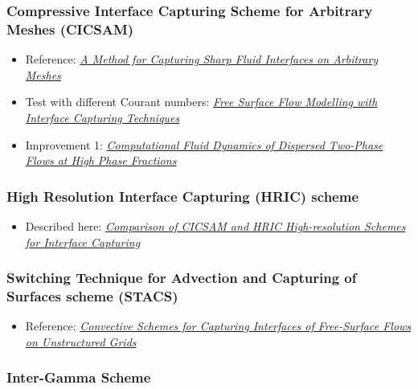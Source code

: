 \documentclass[]{report}
\begin{document}
\subsubsection{Compressive Interface Capturing Scheme for Arbitrary Meshes (CICSAM)}

\begin{itemize}
    \item Reference: \textit{\href{http://ac.els-cdn.com/S0021999199962769/1-s2.0-S0021999199962769-main.pdf?_tid=85161b57da5f4401e55c9d07495e24ea&acdnat=1336167249_a59e4f578adbacf3bff69936c48cdd57}{A Method for Capturing Sharp Fluid Interfaces on Arbitrary Meshes}}
    \item Test with different Courant numbers: \textit{\href{http://www.marin.nl/upload_mm/8/2/c/1807524470_1999999096_2007-ECCOMAS_HoekstraVazAbeilBunnik.pdf}{Free Surface Flow Modelling with Interface Capturing Techniques}}
    \item Improvement 1: \textit{\href{http://powerlab.fsb.hr/ped/kturbo/openfoam/docs/HenrikRuschePhD2002.pdf}{Computational Fluid Dynamics of Dispersed Two-Phase Flows at High Phase Fractions}}
\end{itemize}

\subsubsection{High Resolution Interface Capturing (HRIC) scheme}

\begin{itemize}
    \item Described here: \textit{\href{http://warminski.pollub.plwww.ptmts.org.pl/Waclaw-Koron-2-08.pdf}{Comparison of CICSAM and HRIC High-resolution Sche\-mes for Interface Capturing}}
\end{itemize}

\subsubsection{Switching Technique for Advection and Capturing of Surfaces scheme (STACS)}

\begin{itemize}
    \item Reference: \textit{\href{http://webfea-lb.fea.aub.edu.lb/cfd/pdfs/publications2/STACS-Complete.pdf}{Convective Schemes for Capturing Interfaces of Free-Surface Flows on Unstructured Grids}}
\end{itemize}

\subsubsection{Inter-Gamma Scheme}
\end{document}
